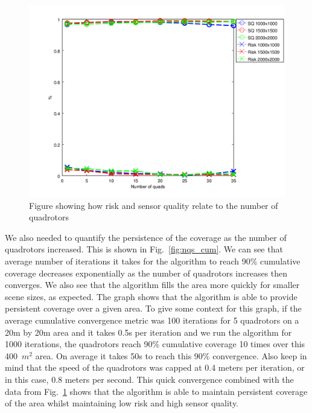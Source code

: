 \documentclass{article}
\begin{document}
\begin{figure}[h!]

    \includegraphics[width=1\columnwidth]{tasefigs/perf_quads_sq_risk.png}

    \caption{Figure showing how risk and sensor quality relate to the number of
    quadrotors}

    \label{fig:nqs_r_sq}

\end{figure}

We also needed to quantify the persistence of the coverage as the number of
quadrotors increased. This is shown in Fig.~\ref{fig:nqs_cum}. We can see that
average number of iterations it takes for the algorithm to reach 90\%
cumulative coverage decreases exponentially as the number of quadrotors
increases then converges. We also see that the algorithm fills the area more
quickly for smaller scene sizes, as expected. The graph shows that the
algorithm is able to provide persistent coverage over a given area. To give
some context for this graph, if the average cumulative convergence metric was
100 iterations for 5 quadrotors on a 20m by 20m area and it takes 0.5s per
iteration and we run the algorithm for 1000 iterations, the quadrotors reach
90\% cumulative coverage 10 times over this 400~$m^2$ area. On average it takes
50s to reach this 90\% convergence. Also keep in mind that the speed of the
quadrotors was capped at 0.4 meters per iteration, or in this case, 0.8 meters
per second. This quick convergence combined with the data from
Fig.~\ref{fig:nqs_r_sq} shows that the algorithm is able to maintain persistent
coverage of the area whilst maintaining low risk and high sensor quality.
\end{document}
